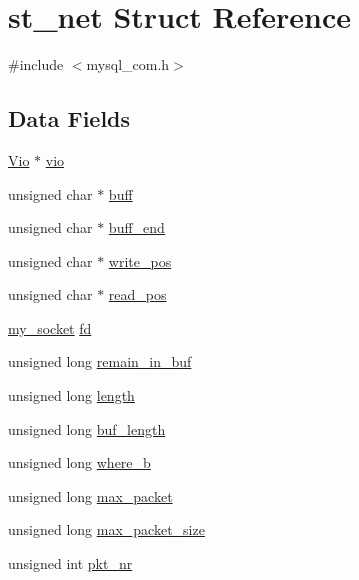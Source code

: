 \hypertarget{structst__net}{}\section{st\+\_\+net Struct Reference}
\label{structst__net}


{\ttfamily \#include $<$mysql\+\_\+com.\+h$>$}

\subsection*{Data Fields}
\begin{DoxyCompactItemize}
\item 
\hyperlink{mysql__com_8h_a398c428bc2e077b9c404e6b81b813c5c}{Vio} $\ast$ \hyperlink{structst__net_a04dd4cfb0c11319b3ced573c160d75d5}{vio}
\item 
unsigned char $\ast$ \hyperlink{structst__net_a3acff748ebe3823c50d6c77d09281c79}{buff}
\item 
unsigned char $\ast$ \hyperlink{structst__net_ab8bc042e4c3feef2117642cee822dc65}{buff\+\_\+end}
\item 
unsigned char $\ast$ \hyperlink{structst__net_af160b75bc1ab06bd72a88ba7417f826e}{write\+\_\+pos}
\item 
unsigned char $\ast$ \hyperlink{structst__net_af65adc7b04ff56e008c6f8ca89cc12c2}{read\+\_\+pos}
\item 
\hyperlink{mysql_8h_aed973571b4b7eb2facd8c39e8b500bb6}{my\+\_\+socket} \hyperlink{structst__net_aec6de4e9b1fccc6ae611ef83cf06e689}{fd}
\item 
unsigned long \hyperlink{structst__net_a99914ead05fefebd1b5033aac14f57c4}{remain\+\_\+in\+\_\+buf}
\item 
unsigned long \hyperlink{structst__net_a5b8619539c5be9ee32051f3e063d428e}{length}
\item 
unsigned long \hyperlink{structst__net_a4c85ad00063e8dc380d73c61b8556c3a}{buf\+\_\+length}
\item 
unsigned long \hyperlink{structst__net_ac77e87598c188a301184a305b2766c9c}{where\+\_\+b}
\item 
unsigned long \hyperlink{structst__net_aa992b03f110362b7281ad288326d29e8}{max\+\_\+packet}
\item 
unsigned long \hyperlink{structst__net_a519fa13bc0447d4058c9f32b9b34a08a}{max\+\_\+packet\+\_\+size}
\item 
unsigned int \hyperlink{structst__net_aee20cf636fc25c58b9da8c9aeabc33a9}{pkt\+\_\+nr}
\item 

\end{DoxyCompactItemize}
